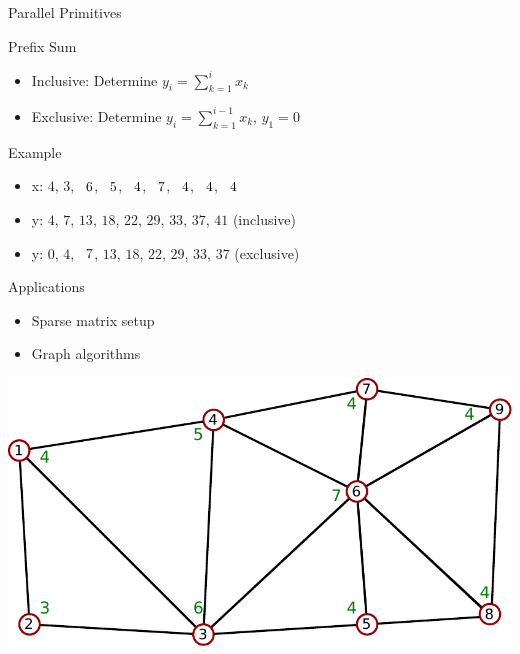 





\begin{frame}[fragile]{Parallel Primitives}

\begin{minipage}{0.7\textwidth}
\begin{block}{Prefix Sum}
  \begin{itemize}
   \item Inclusive: Determine $y_i = \sum_{k=1}^i x_k$
   \item Exclusive: Determine $y_i = \sum_{k=1}^{i-1} x_k$, $y_1 = 0$
  \end{itemize}
\end{block}

\begin{block}{Example}
 \begin{itemize}
  \item x: $4$, $3$,  $\hphantom{1}6$,  $\hphantom{1}5$,  $\hphantom{1}4$,  $\hphantom{1}7$,  $\hphantom{1}4$,  $\hphantom{1}4$,  $\hphantom{1}4$
  \item y: $4$, $7$,             $13$,             $18$,             $22$,             $29$,             $33$,             $37$,             $41$ (inclusive)
  \item y: $0$, $4$,  $\hphantom{1}7$,             $13$,             $18$,             $22$,             $29$,             $33$,             $37$ (exclusive)
 \end{itemize}

\end{block}

\begin{block}{Applications}
  \begin{itemize}
   \item Sparse matrix setup
   \item Graph algorithms
  \end{itemize}
\end{block}
\vspace*{1cm}
\end{minipage}
\begin{minipage}{0.2\textwidth}
\vspace*{4cm} \hspace*{-3.5cm}\includegraphics[width=2.8\textwidth]{figures/graph-1}
\end{minipage}


\end{frame}
